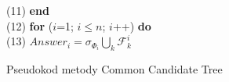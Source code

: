 \begin{figure}[h]
	\hspace*{6em} (11)\hspace{1em} \textbf{end} \\
	\hspace*{6em} (12)\hspace{1em} \textbf{for} ($i$=1; $i \leq n$; $i$++) \textbf{do} \\
	\hspace*{6em} (13)\hspace{2em}    $Answer_i = \sigma_{\Phi_i} \bigcup_k \mathcal{F}_k^i$
	\caption{Pseudokod metody Common Candidate Tree}
	\label{fig:CCTFigure}
\end{figure}